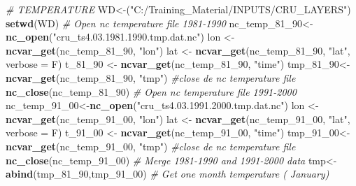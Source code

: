 \documentclass[
  10pt,
  b5paper,
]{book}
\newenvironment{Shaded}{\begin{snugshade}}{\end{snugshade}}
\newcommand{\CommentTok}[1]{\textcolor[rgb]{0.56,0.35,0.01}{\textit{#1}}}
\newcommand{\DataTypeTok}[1]{\textcolor[rgb]{0.13,0.29,0.53}{#1}}
\newcommand{\DecValTok}[1]{\textcolor[rgb]{0.00,0.00,0.81}{#1}}
\newcommand{\KeywordTok}[1]{\textcolor[rgb]{0.13,0.29,0.53}{\textbf{#1}}}
\newcommand{\NormalTok}[1]{#1}
\newcommand{\StringTok}[1]{\textcolor[rgb]{0.31,0.60,0.02}{#1}}
\begin{document}
\begin{Shaded}
\begin{Highlighting}[]
\CommentTok{# TEMPERATURE}
\NormalTok{WD<-(}\StringTok{"C:/Training_Material/INPUTS/CRU_LAYERS"}\NormalTok{)}
\KeywordTok{setwd}\NormalTok{(WD)}
 \CommentTok{# Open nc temperature file 1981-1990}
\NormalTok{nc_temp_}\DecValTok{81}\NormalTok{_}\DecValTok{90}\NormalTok{<-}\KeywordTok{nc_open}\NormalTok{(}\StringTok{"cru_ts4.03.1981.1990.tmp.dat.nc"}\NormalTok{)}
\NormalTok{ lon <-}\StringTok{ }\KeywordTok{ncvar_get}\NormalTok{(nc_temp_}\DecValTok{81}\NormalTok{_}\DecValTok{90}\NormalTok{, }\StringTok{"lon"}\NormalTok{)}
\NormalTok{lat <-}\StringTok{ }\KeywordTok{ncvar_get}\NormalTok{(nc_temp_}\DecValTok{81}\NormalTok{_}\DecValTok{90}\NormalTok{, }\StringTok{"lat"}\NormalTok{, }\DataTypeTok{verbose =}\NormalTok{ F)}
\NormalTok{t_}\DecValTok{81}\NormalTok{_}\DecValTok{90}\NormalTok{ <-}\StringTok{ }\KeywordTok{ncvar_get}\NormalTok{(nc_temp_}\DecValTok{81}\NormalTok{_}\DecValTok{90}\NormalTok{, }\StringTok{"time"}\NormalTok{)}
\NormalTok{ tmp_}\DecValTok{81}\NormalTok{_}\DecValTok{90}\NormalTok{<-}\KeywordTok{ncvar_get}\NormalTok{(nc_temp_}\DecValTok{81}\NormalTok{_}\DecValTok{90}\NormalTok{, }\StringTok{"tmp"}\NormalTok{)}
 \CommentTok{#close de nc temperature file}
 \KeywordTok{nc_close}\NormalTok{(nc_temp_}\DecValTok{81}\NormalTok{_}\DecValTok{90}\NormalTok{) }
 \CommentTok{# Open nc temperature file 1991-2000}
\NormalTok{nc_temp_}\DecValTok{91}\NormalTok{_}\DecValTok{00}\NormalTok{<-}\KeywordTok{nc_open}\NormalTok{(}\StringTok{"cru_ts4.03.1991.2000.tmp.dat.nc"}\NormalTok{)}
\NormalTok{ lon <-}\StringTok{ }\KeywordTok{ncvar_get}\NormalTok{(nc_temp_}\DecValTok{91}\NormalTok{_}\DecValTok{00}\NormalTok{, }\StringTok{"lon"}\NormalTok{)}
\NormalTok{lat <-}\StringTok{ }\KeywordTok{ncvar_get}\NormalTok{(nc_temp_}\DecValTok{91}\NormalTok{_}\DecValTok{00}\NormalTok{, }\StringTok{"lat"}\NormalTok{, }\DataTypeTok{verbose =}\NormalTok{ F)}
\NormalTok{t_}\DecValTok{91}\NormalTok{_}\DecValTok{00}\NormalTok{ <-}\StringTok{ }\KeywordTok{ncvar_get}\NormalTok{(nc_temp_}\DecValTok{91}\NormalTok{_}\DecValTok{00}\NormalTok{, }\StringTok{"time"}\NormalTok{)}
\NormalTok{ tmp_}\DecValTok{91}\NormalTok{_}\DecValTok{00}\NormalTok{<-}\KeywordTok{ncvar_get}\NormalTok{(nc_temp_}\DecValTok{91}\NormalTok{_}\DecValTok{00}\NormalTok{, }\StringTok{"tmp"}\NormalTok{)}
 \CommentTok{#close de nc temperature file}
 \KeywordTok{nc_close}\NormalTok{(nc_temp_}\DecValTok{91}\NormalTok{_}\DecValTok{00}\NormalTok{) }
 \CommentTok{# Merge 1981-1990 and 1991-2000 data }
\NormalTok{ tmp<-}\KeywordTok{abind}\NormalTok{(tmp_}\DecValTok{81}\NormalTok{_}\DecValTok{90}\NormalTok{,tmp_}\DecValTok{91}\NormalTok{_}\DecValTok{00}\NormalTok{)}
 \CommentTok{# Get one month temperature ( January)}
 

\end{Highlighting}
\end{Shaded}
\end{document}
